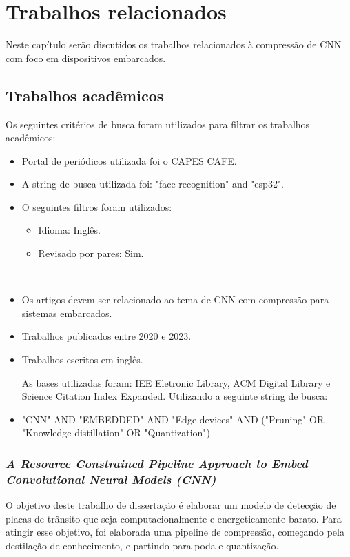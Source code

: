 \chapter{Trabalhos relacionados}\label{cap_trabalhos_relacionados}

Neste capítulo serão discutidos os trabalhos relacionados à compressão de CNN com foco em dispositivos
embarcados.

\section{Trabalhos acadêmicos}

Os seguintes critérios de busca foram utilizados para filtrar os trabalhos acadêmicos:

\begin{itemize}
	\item Portal de periódicos utilizada foi o CAPES CAFE.
	\item A string de busca utilizada foi: "face recognition" and "esp32".
	\item O seguintes filtros foram utilizados:
	\begin{itemize}
		\item Idioma: Inglês.
		\item Revisado por pares: Sim.
	\end{itemize}
---
	\item Os artigos devem ser relacionado ao tema de CNN com compressão para sistemas embarcados.
	\item Trabalhos publicados entre 2020 e 2023.
	\item Trabalhos escritos em inglês.

	As bases utilizadas foram: IEE Eletronic Library, ACM Digital Library e Science Citation Index Expanded.
	Utilizando a seguinte string de busca:
	\item "CNN"  AND "EMBEDDED" AND "Edge devices" AND ("Pruning" OR "Knowledge distillation" OR "Quantization")
\end{itemize}

\subsection{\textit{A Resource Constrained Pipeline Approach to Embed Convolutional Neural Models (CNN)}}
O objetivo deste trabalho de dissertação \cite{rafael} é elaborar um modelo de detecção de placas de trânsito que seja
computacionalmente e energeticamente barato. Para atingir esse objetivo, foi elaborada uma pipeline de compressão,
começando pela destilação de conhecimento, e partindo para poda e quantização.

